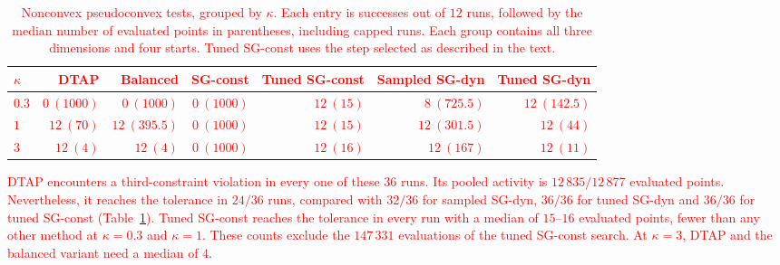 \documentclass[]{interact}
\theoremstyle{plain}
\theoremstyle{definition}
\theoremstyle{remark}
\begin{document}
\begin{table}[t]
\centering\small
\setlength{\tabcolsep}{5pt}
\caption{\textcolor{red}{Nonconvex pseudoconvex tests, grouped by $\kappa$.
Each entry is successes out of $12$ runs, followed by the median number
of evaluated points in parentheses, including capped runs. Each group
contains all three dimensions and four starts. Tuned SG-const uses the step
selected as described in the text.}}
\label{tab:synthetic-scale}
\begin{tabular}{@{}lrrrrrr@{}}
\toprule
\leavevmode\textcolor{red}{$\kappa$} & \leavevmode\textcolor{red}{DTAP} & \leavevmode\textcolor{red}{Balanced} & \leavevmode\textcolor{red}{SG-const} & \leavevmode\textcolor{red}{Tuned SG-const} & \leavevmode\textcolor{red}{Sampled SG-dyn} & \leavevmode\textcolor{red}{Tuned SG-dyn}\\
\midrule
\leavevmode\textcolor{red}{$0.3$} & \leavevmode\textcolor{red}{$0\ (1000)$} & \leavevmode\textcolor{red}{$0\ (1000)$} & \leavevmode\textcolor{red}{$0\ (1000)$} & \leavevmode\textcolor{red}{$12\ (15)$} & \leavevmode\textcolor{red}{$8\ (725.5)$} & \leavevmode\textcolor{red}{$12\ (142.5)$}\\
\leavevmode\textcolor{red}{$1$}   & \leavevmode\textcolor{red}{$12\ (70)$} & \leavevmode\textcolor{red}{$12\ (395.5)$} & \leavevmode\textcolor{red}{$0\ (1000)$} & \leavevmode\textcolor{red}{$12\ (15)$} & \leavevmode\textcolor{red}{$12\ (301.5)$} & \leavevmode\textcolor{red}{$12\ (44)$}\\
\leavevmode\textcolor{red}{$3$}   & \leavevmode\textcolor{red}{$12\ (4)$} & \leavevmode\textcolor{red}{$12\ (4)$} & \leavevmode\textcolor{red}{$0\ (1000)$} & \leavevmode\textcolor{red}{$12\ (16)$} & \leavevmode\textcolor{red}{$12\ (167)$} & \leavevmode\textcolor{red}{$12\ (11)$}\\
\bottomrule
\end{tabular}
\end{table}

\leavevmode\textcolor{red}{DTAP encounters a third-constraint violation in every one of these $36$ runs. Its pooled activity is $12\,835/12\,877$ evaluated points. Nevertheless, it reaches the tolerance in $24/36$ runs, compared with $32/36$ for sampled SG-dyn, $36/36$ for tuned SG-dyn and $36/36$ for tuned SG-const (Table~\ref{tab:synthetic-scale}). Tuned SG-const reaches the tolerance in every run with a median of $15$--$16$ evaluated points, fewer than any other method at $\kappa=0.3$ and $\kappa=1$. These counts exclude the $147\,331$ evaluations of the tuned SG-const search. At $\kappa=3$, DTAP and the balanced variant need a median of $4$}.
\end{document}
